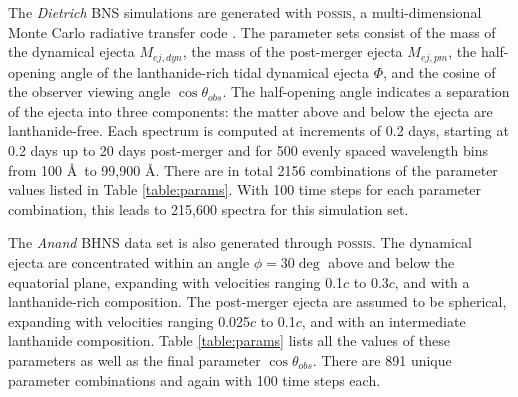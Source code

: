 \documentclass[fleqn,usenatbib,useAMS]{mnras}
\begin{document}
The \emph{Dietrich} BNS simulations are generated with \textsc{possis}, a multi-dimensional Monte Carlo radiative transfer code \citep{bullaPOSSISPredictingSpectra2019}. 
The parameter sets consist of the mass of the dynamical ejecta $M_{ej, dyn}$, the mass of the post-merger ejecta $M_{ej, pm}$, the half-opening angle of the lanthanide-rich tidal dynamical ejecta $\Phi$, and the cosine of the observer viewing angle $\cos \theta_{obs}$.
The half-opening angle indicates a separation of the ejecta into three components: the matter above and below the ejecta are lanthanide-free.
Each spectrum is computed at increments of 0.2 days, starting at 0.2 days up to 20 days post-merger and for 500 evenly spaced wavelength bins from 100 \AA\ to 99,900 \AA. 
There are in total 2156 combinations of the parameter values listed in Table \ref{table:params}.
With 100 time steps for each parameter combination, this leads to 215,600 spectra for this simulation set. 

The \emph{Anand} BHNS data set is also generated through \textsc{possis}.
The dynamical ejecta are concentrated within an angle $\phi = 30 \deg$ above and below the equatorial plane, expanding with velocities ranging 0.1$c$ to 0.3$c$, and with a lanthanide-rich composition. 
The post-merger ejecta are assumed to be spherical, expanding with velocities ranging 0.025$c$ to 0.1$c$, and with an intermediate lanthanide composition. 
Table \ref{table:params} lists all the values of these parameters as well as the final parameter $\cos \theta_{obs}$. 
There are 891 unique parameter combinations and again with 100 time steps each.
\end{document}
